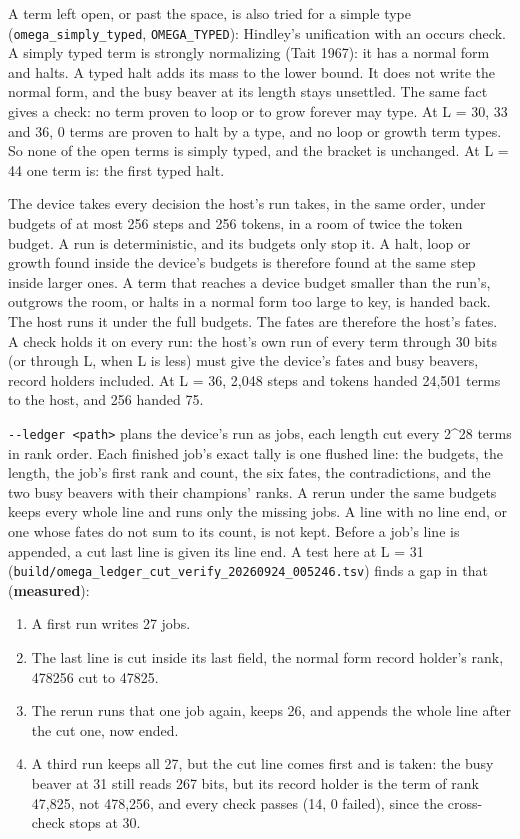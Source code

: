 A term left open, or past the space, is also tried for a simple type (\texttt{omega\_\allowbreak{}simply\_\allowbreak{}typed}, \texttt{OMEGA\_\allowbreak{}TYPED}): Hindley's unification with an occurs check. A simply typed term is strongly normalizing (Tait 1967): it has a normal form and halts. A typed halt adds its mass to the lower bound. It does not write the normal form, and the busy beaver at its length stays unsettled. The same fact gives a check: no term proven to loop or to grow forever may type. At L = 30, 33 and 36, 0 terms are proven to halt by a type, and no loop or growth term types. So none of the open terms is simply typed, and the bracket is unchanged. At L = 44 one term is: the first typed halt.

The device takes every decision the host's run takes, in the same order, under budgets of at most 256 steps and 256 tokens, in a room of twice the token budget. A run is deterministic, and its budgets only stop it. A halt, loop or growth found inside the device's budgets is therefore found at the same step inside larger ones. A term that reaches a device budget smaller than the run's, outgrows the room, or halts in a normal form too large to key, is handed back. The host runs it under the full budgets. The fates are therefore the host's fates. A check holds it on every run: the host's own run of every term through 30 bits (or through L, when L is less) must give the device's fates and busy beavers, record holders included. At L = 36, 2,048 steps and tokens handed 24,501 terms to the host, and 256 handed 75.

\texttt{-\allowbreak{}-\allowbreak{}ledger <path>} plans the device's run as jobs, each length cut every 2\textasciicircum{}28 terms in rank order. Each finished job's exact tally is one flushed line: the budgets, the length, the job's first rank and count, the six fates, the contradictions, and the two busy beavers with their champions' ranks. A rerun under the same budgets keeps every whole line and runs only the missing jobs. A line with no line end, or one whose fates do not sum to its count, is not kept. Before a job's line is appended, a cut last line is given its line end. A test here at L = 31 (\texttt{build/\allowbreak{}omega\_\allowbreak{}ledger\_\allowbreak{}cut\_\allowbreak{}verify\_\allowbreak{}20260924\_\allowbreak{}005246.\allowbreak{}tsv}) finds a gap in that (\textbf{measured}):

\begin{enumerate}
\item A first run writes 27 jobs.
\item The last line is cut inside its last field, the normal form record holder's rank, 478256 cut to 47825.
\item The rerun runs that one job again, keeps 26, and appends the whole line after the cut one, now ended.
\item A third run keeps all 27, but the cut line comes first and is taken: the busy beaver at 31 still reads 267 bits, but its record holder is the term of rank 47,825, not 478,256, and every check passes (14, 0 failed), since the cross-check stops at 30.
\end{enumerate}

